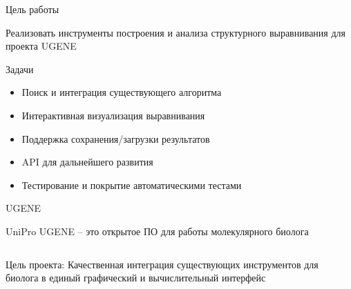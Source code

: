 \documentclass[utf8, professionalfont]{beamer}
\begin{document}
\begin{frame}{Цель работы}
\begin{center}
\Large Реализовать инструменты построения и анализа структурного выравнивания для проекта UGENE
\end{center}
\vspace{11pt}
Задачи
\begin{itemize}
	\item Поиск и интеграция существующего алгоритма 
	\item Интерактивная визуализация выравнивания
	\item Поддержка сохранения/загрузки результатов 
	\item API для дальнейшего развития
	\item Тестирование и покрытие автоматическими тестами
\end{itemize}
\end{frame}

\begin{frame}{UGENE}
\begin{center}
\Large{UniPro UGENE -- это открытое ПО для работы молекулярного биолога}
\end{center}

\begin{columns}
	
	Цель проекта: Качественная интеграция существующих инструментов для биолога в единый графический и вычислительный интерфейс
	
\end{columns}
\end{frame}
\end{document}
